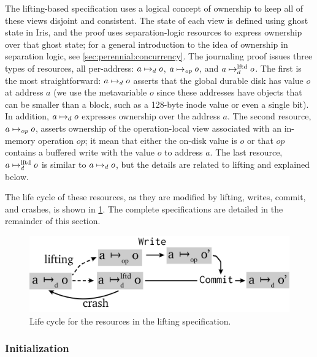 The lifting-based specification uses a logical concept of ownership to keep all
of these views disjoint and consistent. The state of each view is defined using ghost state
in Iris, and the proof uses separation-logic resources to express ownership over that
ghost state; for a general introduction to the idea of
ownership in separation logic, see \cref{sec:perennial:concurrency}. The
journaling proof issues three types of resources, all per-address:
$a \mapsto_d o$, $a \mapsto_{\mathit{op}} o$, and $a \mapsto_d^{\mathrm{lftd}} o$. The first is the most
straightforward: $a \mapsto_d o$ asserts that the global durable disk has
value $o$ at address $a$ (we use the metavariable $o$ since these addresses have
objects that can be smaller than a block, such as a 128-byte inode value or even
a single bit). In addition, $a \mapsto_d o$ expresses ownership over the
address $a$. The second resource, $a \mapsto_{\mathit{op}} o$, asserts ownership of the
operation-local view associated with an in-memory operation $\mathit{op}$; it
mean that either the on-disk value is $o$ or that $\mathit{op}$ contains a
buffered write with the value $o$ to address $a$. The last resource,
$a \mapsto_d^{\mathrm{lftd}} o$ is similar to $a \mapsto_d o$, but the details are related
to lifting and explained below.

The life cycle of these resources, as they are modified by lifting, writes,
commit, and crashes, is shown in \cref{fig:gojournal-resources}. The complete
specifications are detailed in the remainder of this section.

\begin{figure}[hb]
  \centering
  \includegraphics{fig/gojournal-resources.png}
  \vspace{0.5\baselineskip}
  \caption{Life cycle for the resources in the lifting specification.}
  \label{fig:gojournal-resources}
\end{figure}


\subsubsection{Initialization}


